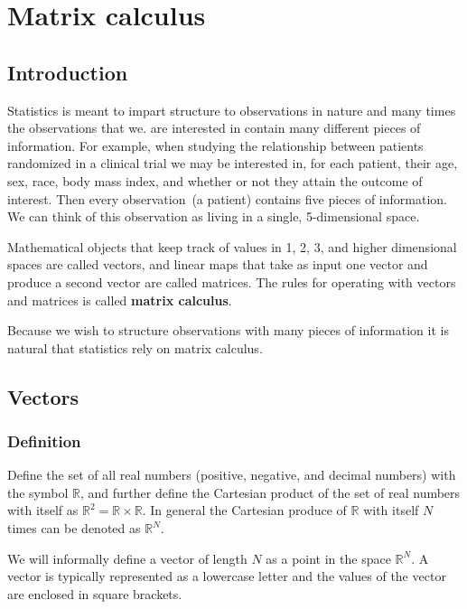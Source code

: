\chapter{Matrix calculus}
\hspace{1mm}

\section{Introduction}\label{intro}

Statistics is meant to impart structure to observations in nature and many times the observations that we. are interested in contain many different pieces of information. 
For example, when studying the relationship between patients randomized in a clinical trial we may be interested in, for each patient, their age, sex, race, body mass index, and whether or not they attain the outcome of interest. 
Then every observation~(a patient) contains five pieces of information. 
We can think of this observation as living in a single, 5-dimensional space. 

Mathematical objects that keep track of values in 1, 2, 3, and higher dimensional spaces are called vectors, and linear maps that take as input one vector and produce a second vector are called matrices. 
The rules for operating with vectors and matrices is called \textbf{matrix calculus}. 

Because we wish to structure observations with many pieces of information it is natural that statistics rely on matrix calculus.


\section{ Vectors }
\hspace{1mm}
\subsection{Definition}
Define the set of all real numbers (positive, negative, and decimal numbers) with the symbol $\mathbb{R}$, and further define the Cartesian product of the set of real numbers with itself as $\mathbb{R}^{2} = \mathbb{R} \times \mathbb{R}$. 
In general the Cartesian produce of $\mathbb{R}$ with itself $N$ times can be denoted as $\mathbb{R}^{N}$.

We will informally define a vector of length $N$ as a point in the space $\mathbb{R}^{N}$.
A vector is typically represented as a lowercase letter and the values of the vector are enclosed in square brackets. 

